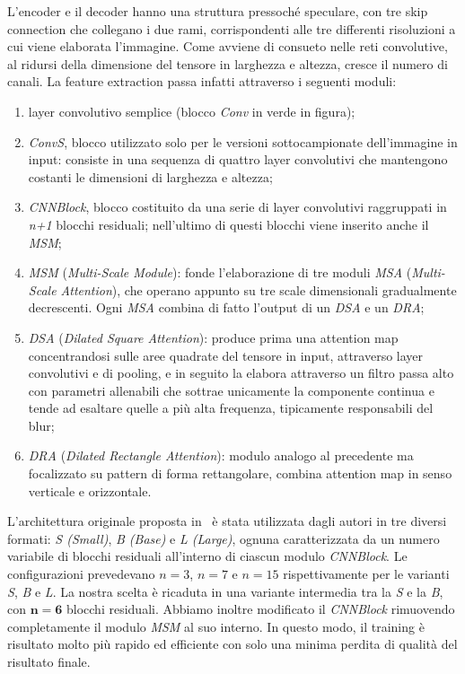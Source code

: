 \documentclass[a4paper,10pt,twocolumn]{article}
\begin{document}
L'encoder e il decoder hanno una struttura pressoché speculare, con tre skip connection che collegano i due rami, corrispondenti alle tre differenti risoluzioni a cui viene elaborata l'immagine. Come avviene di consueto nelle reti convolutive,
al ridursi della dimensione del tensore in larghezza e altezza, cresce il numero di canali. La feature extraction passa infatti attraverso i seguenti moduli:
\begin{enumerate}[label=\textbf{(\alph*)}]
  \item layer convolutivo semplice (blocco \textit{Conv} in verde in figura);
  \item \textit{ConvS}, blocco utilizzato solo per le versioni sottocampionate dell'immagine in input: consiste in una sequenza di quattro layer convolutivi che mantengono costanti le dimensioni di larghezza e altezza;
  \item \textit{CNNBlock}, blocco costituito da una serie di layer convolutivi raggruppati in \textit{n+1} blocchi residuali; nell'ultimo di questi blocchi viene inserito anche il \textit{MSM};
  \item \textit{MSM} (\textit{Multi-Scale Module}): fonde l'elaborazione di tre moduli \textit{MSA} (\textit{Multi-Scale Attention}), che operano appunto su tre scale dimensionali gradualmente decrescenti.
    Ogni \textit{MSA} combina di fatto l'output di un \textit{DSA} e un \textit{DRA};
  \item \textit{DSA} (\textit{Dilated Square Attention}): produce prima una attention map concentrandosi sulle aree quadrate del tensore in input, attraverso layer convolutivi e di pooling,
    e in seguito la elabora attraverso un filtro passa alto con parametri allenabili che sottrae unicamente la componente continua e tende ad esaltare quelle a più alta frequenza,
    tipicamente responsabili del blur;
  \item \textit{DRA} (\textit{Dilated Rectangle Attention}): modulo analogo al precedente ma focalizzato su pattern di forma rettangolare, combina attention map in senso verticale e orizzontale.
\end{enumerate}

L'architettura originale proposta in~\cite{convir} è stata utilizzata dagli autori in tre diversi formati: \textit{S (Small)}, \textit{B (Base)} e \textit{L (Large)}, ognuna caratterizzata da un numero variabile di blocchi residuali all'interno di ciascun modulo \textit{CNNBlock}.
Le configurazioni prevedevano \(n=3\), \(n=7\) e \(n=15\) rispettivamente per le varianti \textit{S}, \textit{B} e \textit{L}. La nostra scelta è ricaduta in una variante intermedia tra la \textit{S} e la \textit{B}, con \(\mathbf{n=6}\) blocchi residuali.
Abbiamo inoltre modificato il \textit{CNNBlock} rimuovendo completamente il modulo \textit{MSM} al suo interno. In questo modo, il training è risultato molto più rapido ed efficiente con solo una minima perdita di qualità del risultato finale.
\end{document}
